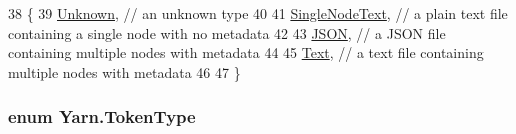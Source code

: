 \begin{DoxyCode}
38     \{
39         \hyperlink{a00029_ad7ebb46e7309ead8767383a672b3272fa88183b946cc5f0e8c96b2e66e1c74a7e}{Unknown}, \textcolor{comment}{// an unknown type}
40 
41         \hyperlink{a00029_ad7ebb46e7309ead8767383a672b3272faceeb33da53902872b63956f8df786cd8}{SingleNodeText}, \textcolor{comment}{// a plain text file containing a single node with no metadata}
42 
43         \hyperlink{a00029_ad7ebb46e7309ead8767383a672b3272fa0ecd11c1d7a287401d148a23bbd7a2f8}{JSON}, \textcolor{comment}{// a JSON file containing multiple nodes with metadata}
44 
45         \hyperlink{a00029_a301aa7c866593a5b625a8fc158bbeacea9dffbf69ffba8bc38bc4e01abf4b1675}{Text}, \textcolor{comment}{//  a text file containing multiple nodes with metadata}
46 
47     \}
\end{DoxyCode}
\hypertarget{a00029_a301aa7c866593a5b625a8fc158bbeace}{
\subsubsection[{Token\-Type}]{\setlength{\rightskip}{0pt plus 5cm}enum {\bf Yarn.\-Token\-Type}\hspace{0.3cm}{\ttfamily [package]}}}\label{a00029_a301aa7c866593a5b625a8fc158bbeace}
